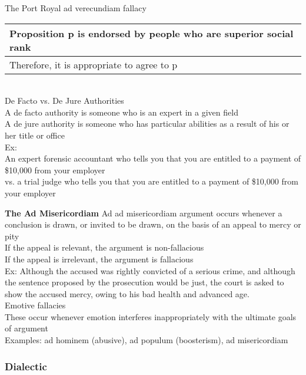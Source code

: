 The Port Royal ad verecundiam fallacy\\
\begin{tabular}{p{12cm}}
    Proposition p is endorsed by people who are superior social rank\\
    \hline
    Therefore, it is appropriate to agree to p
\end{tabular}\\

De Facto vs. De Jure Authorities\\
A de facto authority is someone who is an expert in a given field\\
A de jure authority is someone who has particular abilities as a result of his or her title or office\\

Ex:\\
An expert forensic accountant who tells you that you are entitled to a payment of \$10,000 from your employer\\
vs. a trial judge who tells you that you are entitled to a payment of \$10,000 from your employer

\textbf{The Ad Misericordiam}
Ad ad misericordiam argument occurs whenever a conclusion is drawn, or invited to be drawn, on the basis of an appeal to mercy or pity\\
If the appeal is relevant, the argument is non-fallacious\\
If the appeal is irrelevant, the argument is fallacious\\

Ex: Although the accused was rightly convicted of a serious crime, and although the sentence proposed by the prosecution would be just, the court is asked to show the accused mercy, owing to his bad health and advanced age.\\

Emotive fallacies\\
These occur whenever emotion interferes inappropriately with the ultimate goals of argument\\
Examples: ad hominem (abusive), ad populum (boosterism), ad misericordiam

\subsubsection{Dialectic}


